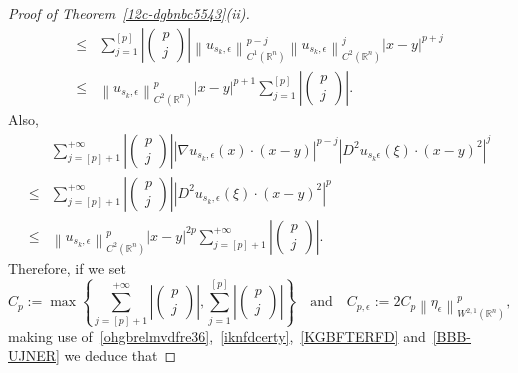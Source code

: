\documentclass[12pt]{article}
\newcommand{\R}{\mathbb{R}}
\numberwithin{equation}{section}
\renewcommand{\leq}{\leqslant}
\begin{document}
\begin{proof}[Proof of Theorem~\ref{12c-dgbnbc5543}(ii)]
\begin{equation}
\begin{split}
\leq & \sum_{j=1}^{\left[p\right]} \left|\begin{pmatrix}p\\j \end{pmatrix}\right|\left\| u_{s_k,\epsilon}\right\|_{C^1(\R^n)}^{p-j} \left\|u_{s_k,\epsilon}\right\|_{C^2(\R^n)}^{j}\left|x-y\right|^{p+j}\\
\leq & \left\| u_{s_k,\epsilon}\right\|_{C^2(\R^n)}^{p}\left|x-y\right|^{p+1}\sum_{j=1}^{\left[p\right]} \left|\begin{pmatrix}p\\j \end{pmatrix}\right|.
\end{split}
\end{equation}
Also,
\begin{equation}\label{BBB-UJNER}
\begin{split}
&\sum_{j=\left[p\right]+1}^{+\infty} \left|\begin{pmatrix}p\\j \end{pmatrix}\right|\left|\nabla u_{s_k,\epsilon} (x) \cdot(x-y)\right|^{p-j}\left|D^2u_{s_k\epsilon}(\xi)\cdot(x-y)^2 \right|^{j}\\
\leq & \sum_{j=\left[p\right]+1}^{+\infty}\left|\begin{pmatrix}p\\j \end{pmatrix}\right|\left|D^2u_{s_k,\epsilon}(\xi)\cdot(x-y)^2 \right|^{p}\\
\leq & \left\|u_{s_k,\epsilon} \right\|_{C^2(\R^n)}^{p}\left|x-y\right|^{2p}\sum_{j=\left[p\right]+1}^{+\infty}\left|\begin{pmatrix}p\\j \end{pmatrix}\right|. 
\end{split}
\end{equation}
Therefore, if we set 
\begin{equation*}
C_{p}:=\max \left\lbrace \sum_{j=\left[p\right]+1}^{+\infty}\left|\begin{pmatrix} p\\j \end{pmatrix}\right|,\sum_{j=1}^{\left[p\right]} \left|\begin{pmatrix}p\\j \end{pmatrix}\right|\right\rbrace\quad\mbox{and}\quad C_{p,\epsilon}:=2C_{p}\left\|\eta_\epsilon \right\|_{W^{2,1}(\R^n)}^p,
\end{equation*}
making use of~\eqref{ohgbrelmvdfre36},~\eqref{iknfdcerty},~\eqref{KGBFTERFD} and~\eqref{BBB-UJNER} we deduce that 

\end{proof}
\end{document}
